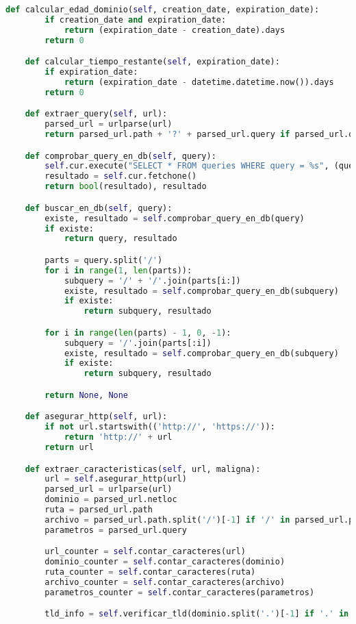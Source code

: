 \documentclass{article}
\begin{document}
\begin{lstlisting}[language=Python, caption=Clase para extraer características de URLs]
    def calcular_edad_dominio(self, creation_date, expiration_date):
        if creation_date and expiration_date:
            return (expiration_date - creation_date).days
        return 0

    def calcular_tiempo_restante(self, expiration_date):
        if expiration_date:
            return (expiration_date - datetime.datetime.now()).days
        return 0

    def extraer_query(self, url):
        parsed_url = urlparse(url)
        return parsed_url.path + '?' + parsed_url.query if parsed_url.query else parsed_url.path

    def comprobar_query_en_db(self, query):
        self.cur.execute("SELECT * FROM queries WHERE query = %s", (query,))
        resultado = self.cur.fetchone()
        return bool(resultado), resultado

    def buscar_en_db(self, query):
        existe, resultado = self.comprobar_query_en_db(query)
        if existe:
            return query, resultado

        parts = query.split('/')
        for i in range(1, len(parts)):
            subquery = '/' + '/'.join(parts[i:])
            existe, resultado = self.comprobar_query_en_db(subquery)
            if existe:
                return subquery, resultado

        for i in range(len(parts) - 1, 0, -1):
            subquery = '/'.join(parts[:i])
            existe, resultado = self.comprobar_query_en_db(subquery)
            if existe:
                return subquery, resultado

        return None, None

    def asegurar_http(self, url):
        if not url.startswith(('http://', 'https://')):
            return 'http://' + url
        return url

    def extraer_caracteristicas(self, url, maligna):
        url = self.asegurar_http(url)
        parsed_url = urlparse(url)
        dominio = parsed_url.netloc
        ruta = parsed_url.path
        archivo = parsed_url.path.split('/')[-1] if '/' in parsed_url.path else ''
        parametros = parsed_url.query

        url_counter = self.contar_caracteres(url)
        dominio_counter = self.contar_caracteres(dominio)
        ruta_counter = self.contar_caracteres(ruta)
        archivo_counter = self.contar_caracteres(archivo)
        parametros_counter = self.contar_caracteres(parametros)

        tld_info = self.verificar_tld(dominio.split('.')[-1] if '.' in dominio else '')


\end{lstlisting}
\end{document}
